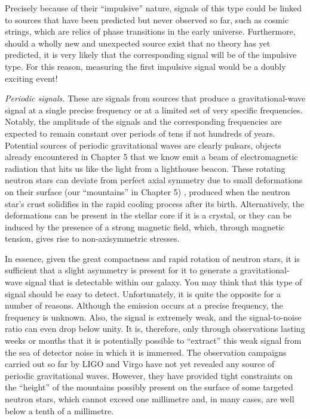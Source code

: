 Precisely because of their ``impulsive'' nature, signals of this type could be linked to
sources that have been predicted but never observed so far, such as cosmic strings,
which are relics of phase transitions in the early universe. Furthermore, should a
wholly new and unexpected source exist that no theory has yet predicted, it is very
likely that the corresponding signal will be of the impulsive type. For this reason,
measuring the first impulsive signal would be a doubly exciting event!

{\setlength{\spaceskip}{\fontdimen2\font plus 2pt minus \fontdimen4\font}
\emph{Periodic signals.} These are signals from sources that produce a
gravitational-wave signal at a single precise frequency or at a limited set of very
specific frequencies. Notably, the amplitude of the signals and the corresponding
frequencies are expected to remain constant over periods of tens if not hundreds of
years. Potential sources of periodic gravitational waves are clearly pulsars, objects
already encountered in Chapter 5 that we know emit a beam of electromagnetic
radiation that hits us like the light from a
lighthouse beacon. These rotating neutron stars can deviate from
perfect axial symmetry due to small deformations on their surface (our ``mountains'' in
Chapter 5) , produced when the neutron star's crust solidifies in the
rapid cooling process after its birth. Alternatively, the deformations can be present in
the stellar core if it is a crystal, or they can be induced by the presence of a strong
magnetic field, which, through magnetic tension, gives rise to non-axisymmetric
stresses.

\par}

In essence, given the great compactness and rapid rotation of neutron stars, it is
sufficient that a slight asymmetry is present for it to generate a gravitational-wave
signal that is detectable within our galaxy. You may think that this type of signal
should be easy to detect. Unfortunately, it is quite the opposite for a number of
reasons. Although the emission occurs at a precise frequency, the frequency is unknown.
Also, the signal is extremely weak, and the
signal-to-noise ratio can even drop below unity.
It is, therefore, only through observations lasting weeks or months that it is
potentially possible to ``extract'' this weak signal from the sea of detector noise in
which it is immersed. The observation campaigns carried out so far by LIGO and Virgo
have not yet revealed any source of periodic gravitational waves. However, they have
provided tight constraints on the ``height'' of the mountains possibly present on the
surface of some targeted neutron stars, which cannot exceed one millimetre and, in many
cases, are well below a tenth of a millimetre.

